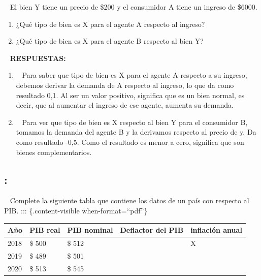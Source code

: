 \documentclass[
  letterpaper,
  DIV=11,
  numbers=noendperiod]{scrreport}
\begin{document}
~ El bien Y tiene un precio de \$200 y el consumidor A tiene un ingreso
de \$6000.

\begin{enumerate}
\def\labelenumi{\alph{enumi})}
\item
  ¿Qué tipo de bien es X para el agente A respecto al ingreso?
\item
  ¿Qué tipo de bien es X para el agente B respecto al bien Y?
\end{enumerate}

~ \textbf{RESPUESTAS:}

\begin{enumerate}
\def\labelenumi{\alph{enumi})}
\item
  ~ Para saber que tipo de bien es X para el agente A respecto a su
  ingreso, debemos derivar la demanda de A respecto al ingreso, lo que
  da como resultado 0,1. Al ser un valor positivo, significa que es un
  bien normal, es decir, que al aumentar el ingreso de ese agente,
  aumenta su demanda.
\item
  ~ Para ver que tipo de bien es X respecto al bien Y para el consumidor
  B, tomamos la demanda del agente B y la derivamos respecto al precio
  de y. Da como resultado -0,5. Como el resultado es menor a cero,
  significa que son bienes complementarios.
\end{enumerate}

\hypertarget{section-32}{%
\subsection{:}\label{section-32}}

~ Complete la siguiente tabla que contiene los datos de un país con
respecto al PIB. ::: \{.content-visible when-format=``pdf''\}

\begin{table}[h]
    \centering
    \begin{tabular}{|p{25mm}|p{25mm}|p{25mm}|p{25mm}|p{25mm}|}
        \hline
        Año & PIB real & PIB nominal & Deflactor del PIB & inflación anual\\ \hline
        2018 & \$ 500 & \$ 512 & & \hspace{11.5mm}X \\ \hline
        2019 & \$ 489 & \$ 501 & &\\ \hline
        2020 & \$ 513 & \$ 545 & &\\ \hline
    \end{tabular}
\end{table}
\end{document}
